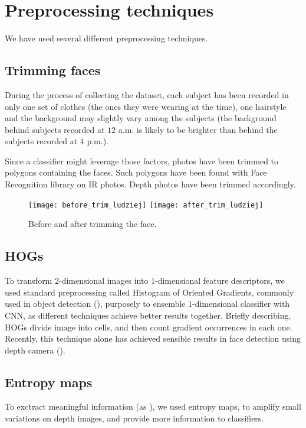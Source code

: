     \section{Preprocessing techniques}
    We have used several different preprocessing techniques.
        \subsection*{Trimming faces}
        \label{sec:trimming}
        During the process of collecting the dataset, each subject has been
        recorded in only one set of clothes (the ones they were wearing at the
        time), one hairstyle and the background may slightly vary among the
        subjects (the background behind subjects recorded at $12$ a.m. is
        likely to be brighter than behind the subjects recorded at $4$ p.m.).

        Since a classifier might leverage those factors, photos have been
        trimmed to polygons containing the faces. Such polygons have been
        found with Face Recognition library \cite{facerecog} on IR photos.
        Depth photos have been trimmed accordingly.

        \begin{figure}[H]
        \caption{Before and after trimming the face.}
        \centering
        \texttt{[image: before\_trim\_ludziej]}
        \texttt{[image: after\_trim\_ludziej]}
        \end{figure}

        \subsection*{HOGs}
        To transform 2-dimensional images into 1-dimensional feature descriptors,
        we used standard preprocessing called Histogram of Oriented Gradients, commonly used in
        object detection (\citeauthor{hog}), purposely to ensemble 1-dimensional classifier with CNN,
        as different techniques achieve better results together. Briefly describing,
        HOGs divide image into cells, and then count gradient occurrences in each one.
        Recently, this technique alone has achieved sensible results in face detection using depth camera (\citeauthor{rgbdhog}).

        \subsection*{Entropy maps}
        To exctract meaningful information (as \citeauthor{rgbdhog}),
        we used entropy maps, to amplify small variations on depth images, and provide
        more information to classifiers.

